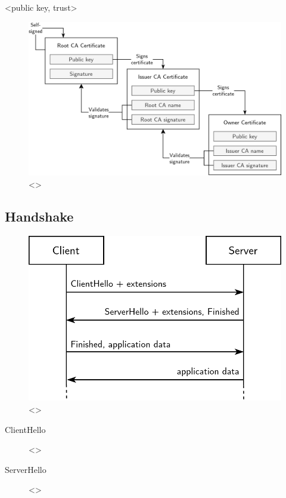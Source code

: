 <public key, trust>

\begin{figure}[ht]
\centerline{\includegraphics[width=160mm]{images/tls-chain.png}}
\caption[TLS certificate chain of trust]{<>}
\label{tls_chain_figure}
\end{figure}

\subsection{Handshake}

\begin{figure}[ht]
\centerline{\includegraphics[width=120mm]{images/tls-handshake.png}}
\caption[Basic TLS 1.3 handshake]{<>}
\label{tls_handshake_figure}
\end{figure}

\begin{description}
	\item[ClientHello] <>
	\item[ServerHello] <>
\end{description}

